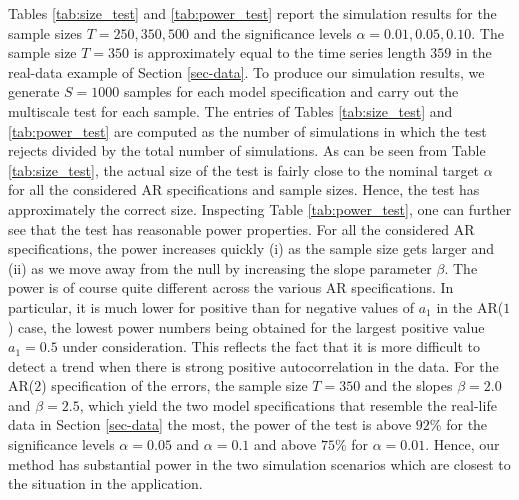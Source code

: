 \newpage

Tables \ref{tab:size_test} and \ref{tab:power_test} report the simulation results for the sample sizes $T=250,350,500$ and the significance levels $\alpha = 0.01, 0.05, 0.10$. The sample size $T = 350$ is approximately equal to the time series length $359$ in the real-data example of Section \ref{sec-data}. To produce our simulation results, we generate $S=1000$ samples for each model specification and carry out the multiscale test for each sample. The entries of Tables \ref{tab:size_test} and \ref{tab:power_test} are computed as the number of simulations in which the test rejects divided by the total number of simulations. As can be seen from Table \ref{tab:size_test}, the actual size of the test is fairly close to the nominal target $\alpha$ for all the considered AR specifications and sample sizes. Hence, the test has approximately the correct size. Inspecting Table \ref{tab:power_test}, one can further see that the test has reasonable power properties. For all the considered AR specifications, the power increases quickly (i) as the sample size gets larger and (ii) as we move away from the null by increasing the slope parameter $\beta$. The power is of course quite different across the various AR specifications. In particular, it is much lower for positive than for negative values of $a_1$ in the AR($1$) case, the lowest power numbers being obtained for the largest positive value $a_1 = 0.5$ under consideration. This reflects the fact that it is more difficult to detect a trend when there is strong positive autocorrelation in the data. For the AR($2$) specification of the errors, the sample size $T=350$ and the slopes $\beta = 2.0$ and $\beta = 2.5$, which yield the two model specifications that resemble the real-life data in Section \ref{sec-data} the most, the power of the test is above $92\%$ for the significance levels $\alpha = 0.05$ and $\alpha = 0.1$ and above $75\%$ for $\alpha = 0.01$. Hence, our method has substantial power in the two simulation scenarios which are closest to the situation in the application. 

 


